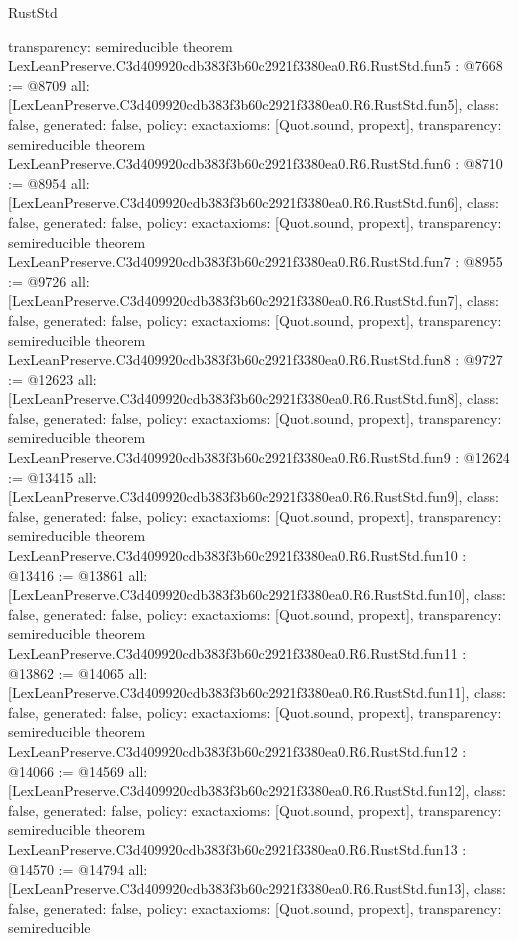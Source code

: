\begin{lexlean}{RustStd}
\begin{coremodule}
{  transparency: semireducible
}
theorem LexLeanPreserve.C3d409920cdb383f3b60c2921f3380ea0.R6.RustStd.fun5 : @7668 := @8709 {
  all: [LexLeanPreserve.C3d409920cdb383f3b60c2921f3380ea0.R6.RustStd.fun5],
  class: false,
  generated: false,
  policy: exact{axioms: [Quot.sound, propext]},
  transparency: semireducible
}
theorem LexLeanPreserve.C3d409920cdb383f3b60c2921f3380ea0.R6.RustStd.fun6 : @8710 := @8954 {
  all: [LexLeanPreserve.C3d409920cdb383f3b60c2921f3380ea0.R6.RustStd.fun6],
  class: false,
  generated: false,
  policy: exact{axioms: [Quot.sound, propext]},
  transparency: semireducible
}
theorem LexLeanPreserve.C3d409920cdb383f3b60c2921f3380ea0.R6.RustStd.fun7 : @8955 := @9726 {
  all: [LexLeanPreserve.C3d409920cdb383f3b60c2921f3380ea0.R6.RustStd.fun7],
  class: false,
  generated: false,
  policy: exact{axioms: [Quot.sound, propext]},
  transparency: semireducible
}
theorem LexLeanPreserve.C3d409920cdb383f3b60c2921f3380ea0.R6.RustStd.fun8 : @9727 := @12623 {
  all: [LexLeanPreserve.C3d409920cdb383f3b60c2921f3380ea0.R6.RustStd.fun8],
  class: false,
  generated: false,
  policy: exact{axioms: [Quot.sound, propext]},
  transparency: semireducible
}
theorem LexLeanPreserve.C3d409920cdb383f3b60c2921f3380ea0.R6.RustStd.fun9 : @12624 := @13415 {
  all: [LexLeanPreserve.C3d409920cdb383f3b60c2921f3380ea0.R6.RustStd.fun9],
  class: false,
  generated: false,
  policy: exact{axioms: [Quot.sound, propext]},
  transparency: semireducible
}
theorem LexLeanPreserve.C3d409920cdb383f3b60c2921f3380ea0.R6.RustStd.fun10 : @13416 := @13861 {
  all: [LexLeanPreserve.C3d409920cdb383f3b60c2921f3380ea0.R6.RustStd.fun10],
  class: false,
  generated: false,
  policy: exact{axioms: [Quot.sound, propext]},
  transparency: semireducible
}
theorem LexLeanPreserve.C3d409920cdb383f3b60c2921f3380ea0.R6.RustStd.fun11 : @13862 := @14065 {
  all: [LexLeanPreserve.C3d409920cdb383f3b60c2921f3380ea0.R6.RustStd.fun11],
  class: false,
  generated: false,
  policy: exact{axioms: [Quot.sound, propext]},
  transparency: semireducible
}
theorem LexLeanPreserve.C3d409920cdb383f3b60c2921f3380ea0.R6.RustStd.fun12 : @14066 := @14569 {
  all: [LexLeanPreserve.C3d409920cdb383f3b60c2921f3380ea0.R6.RustStd.fun12],
  class: false,
  generated: false,
  policy: exact{axioms: [Quot.sound, propext]},
  transparency: semireducible
}
theorem LexLeanPreserve.C3d409920cdb383f3b60c2921f3380ea0.R6.RustStd.fun13 : @14570 := @14794 {
  all: [LexLeanPreserve.C3d409920cdb383f3b60c2921f3380ea0.R6.RustStd.fun13],
  class: false,
  generated: false,
  policy: exact{axioms: [Quot.sound, propext]},
  transparency: semireducible
}
\end{coremodule}
\end{lexlean}
